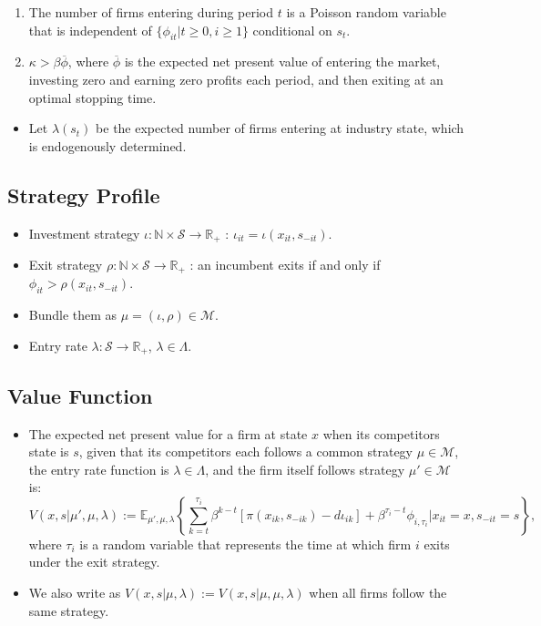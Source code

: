 \documentclass[
]{book}
\providecommand{\tightlist}{%
  \setlength{\itemsep}{0pt}\setlength{\parskip}{0pt}}
\begin{document}
\begin{enumerate}
\def\labelenumi{\arabic{enumi}.}
\tightlist
\item
  The number of firms entering during period \(t\) is a Poisson random variable that is independent of \(\{\phi_{it}| t \ge 0, i \ge 1\}\) conditional on \(s_t\).
\item
  \(\kappa > \beta \overline{\phi}\), where \(\overline{\phi}\) is the expected net present value of entering the market, investing zero and earning zero profits each period, and then exiting at an optimal stopping time.
\end{enumerate}

\begin{itemize}
\tightlist
\item
  Let \(\lambda(s_t)\) be the expected number of firms entering at industry state, which is endogenously determined.
\end{itemize}

\hypertarget{strategy-profile}{%
\subsection{Strategy Profile}\label{strategy-profile}}

\begin{itemize}
\tightlist
\item
  Investment strategy \(\iota: \mathbb{N} \times \mathcal{S} \to \mathbb{R}_+\) : \(\iota_{it} = \iota(x_{it}, s_{-it})\).
\item
  Exit strategy \(\rho: \mathbb{N} \times \mathcal{S} \to \mathbb{R}_+\) : an incumbent exits if and only if \(\phi_{it} > \rho(x_{it}, s_{-it})\).
\item
  Bundle them as \(\mu = (\iota, \rho) \in \mathcal{M}\).
\item
  Entry rate \(\lambda: \mathcal{S} \to \mathbb{R}_+\), \(\lambda \in \Lambda\).
\end{itemize}

\hypertarget{value-function}{%
\subsection{Value Function}\label{value-function}}

\begin{itemize}
\tightlist
\item
  The expected net present value for a firm at state \(x\) when its competitors state is \(s\), given that its competitors each follows a common strategy \(\mu \in \mathcal{M}\), the entry rate function is \(\lambda \in \Lambda\), and the firm itself follows strategy \(\mu' \in \mathcal{M}\) is:
  \[
  V(x, s|\mu', \mu, \lambda) := \mathbb{E}_{\mu', \mu, \lambda}\left\{\sum_{k = t}^{\tau_i} \beta^{k - t}[\pi(x_{ik}, s_{-ik}) - d \iota_{ik}] + \beta^{\tau_i - t} \phi_{i, \tau_i}|x_{it} = x, s_{-it} = s\right\},
  \]
  where \(\tau_i\) is a random variable that represents the time at which firm \(i\) exits under the exit strategy.
\item
  We also write as \(V(x, s|\mu, \lambda) := V(x, s|\mu, \mu, \lambda)\) when all firms follow the same strategy.
\end{itemize}
\end{document}
